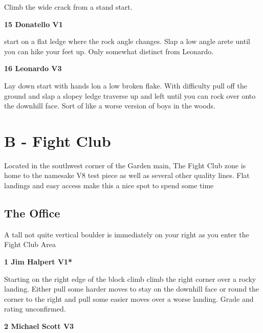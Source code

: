 \begin{multicols}{2}
			\begin{adjustwidth}{0.5cm}{}				
			Climb the wide crack from a stand start.
			\end{adjustwidth}
			\label{rt:Donatello}
\colorbox{green!20}{
\parbox{0.95\linewidth}{
\textbf{
15 Donatello V1  
}
}
}

			\begin{adjustwidth}{0.5cm}{}				
			start on a flat ledge where the rock angle changes. Slap a low angle arete until you can hike your feet up. Only somewhat distinct from Leonardo.
			\end{adjustwidth}
			\label{rt:Leonardo}
\colorbox{green!20}{
\parbox{0.95\linewidth}{
\textbf{
16 Leonardo V3  
}
}
}

			\begin{adjustwidth}{0.5cm}{}				
			Lay down start with hands lon a low broken flake. With difficulty pull off the ground and slap a slopey ledge traverse up and left until you can rock over onto the downhill face. Sort of like a worse version of boys in the woods.
			\end{adjustwidth}
\newpage

		\section{B - Fight Club}\label{sa:Fight Club}
	Located in the southwest corner of the Garden main, The Fight Club zone is home to the namesake V8 test piece as well as several other quality lines. Flat landings and easy access make this a nice spot to spend some time\\

	
		\subsection*{The Office}\label{bf:The Office}
		A tall not quite vertical boulder is immediately on your right as you enter the Fight Club Area\\
	
			\label{rt:Jim Halpert}
\colorbox{green!20}{
\parbox{0.95\linewidth}{
\textbf{
1 Jim Halpert V1*  \warn\warn
}
}
}

			\begin{adjustwidth}{0.5cm}{}				
			Starting on the right edge of the block climb climb the right corner over a rocky landing. Either pull some harder moves to stay on the downhill face or round the corner to the right and pull some easier moves over a worse landing. Grade and rating unconfirmed.
			\end{adjustwidth}
			\label{rt:Michael Scott}
\colorbox{green!20}{
\parbox{0.95\linewidth}{
\textbf{
2 Michael Scott V3  \warn
}
}
}


\end{multicols}
